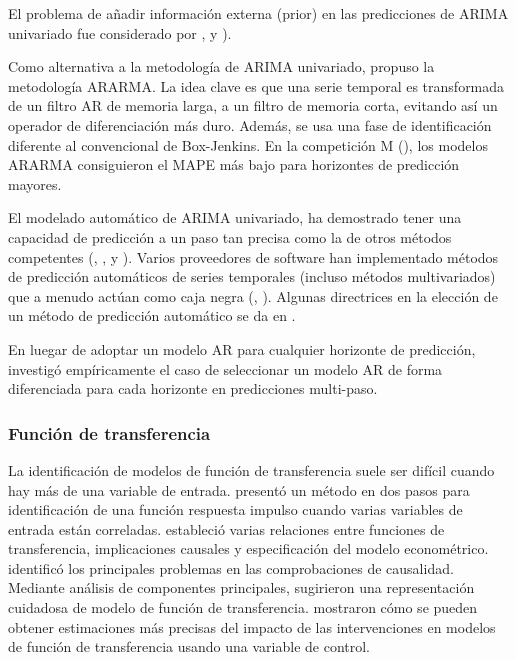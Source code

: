 \documentclass{llncs}
\begin{document}
El problema de añadir información externa (prior) en las predicciones de ARIMA univariado fue considerado por  \cite{Cholette1982375}, \cite{Guerrero1991339} y \cite{deAlba199395}).

Como alternativa a la metodología de ARIMA univariado, \cite{Parzen198267} propuso la metodología ARARMA. La idea clave es que una serie temporal es transformada de un filtro AR de memoria larga, a un filtro de memoria corta, evitando así un operador de diferenciación más duro. Además, se usa una fase de identificación diferente al convencional de Box-Jenkins. En la competición M (\cite{Makridakis1982111}), los modelos ARARMA consiguieron el MAPE más bajo para horizontes de predicción mayores. 

El modelado automático de ARIMA univariado, ha demostrado tener una capacidad de predicción a un paso tan precisa como la de otros métodos competentes (\cite{Hill1984319}, \cite{Libert1984325}, \cite{Poulos1987261} y \cite{Texter1989209}). Varios proveedores de software han implementado métodos de predicción automáticos de series temporales (incluso métodos multivariados) que a menudo actúan como caja negra (\cite{Geriner1991127}, \cite{Tashman2000437}). Algunas directrices en la elección de un método de predicción automático se da en \cite{Chatfield198819}.

En luegar de adoptar un modelo AR para cualquier horizonte de predicción, \cite{Kang2003387} investigó empíricamente el caso de seleccionar un modelo AR de forma diferenciada para cada horizonte en predicciones multi-paso.

\subsubsection{Función de transferencia}
La identificación de modelos de función de transferencia suele ser difícil cuando hay más de una variable de entrada. \cite{Edlund1984297} presentó un método en dos pasos para identificación de una función respuesta impulso cuando varias variables de entrada están correladas. \cite{Koreisha1983151} estableció varias relaciones entre funciones de transferencia, implicaciones causales y especificación del modelo econométrico. \cite{Gupta1987195} identificó los principales problemas en las comprobaciones de causalidad. Mediante análisis de componentes principales, \cite{DelMoral1997237} sugirieron una representación cuidadosa de modelo de función de transferencia. \cite{Krishnamurthi198921} mostraron cómo se pueden obtener estimaciones más precisas del impacto de las intervenciones en modelos de función de transferencia usando una variable de control.
\end{document}
